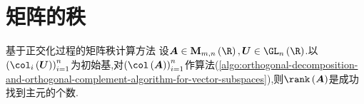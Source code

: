 \section{矩阵的秩}

\begin{theorem}{基于正交化过程的矩阵秩计算方法}{}
	设$\boldsymbol{A}\in\mathbf{M}_{m,n}\left(\R\right),\boldsymbol{U}\in\GL_{n}\left(\R\right)$.以$\left(\col_{i}\left(\boldsymbol{U}\right)\right)_{i=1}^{n}$为初始基,对$\left(\col\left(\boldsymbol{A}\right)\right)_{i=1}^{n}$作算法(\ref{algo:orthogonal-decomposition-and-orthogonal-complement-algorithm-for-vector-subspaces}),则$\rank\left(\boldsymbol{A}\right)$是成功找到主元的个数.
\end{theorem}